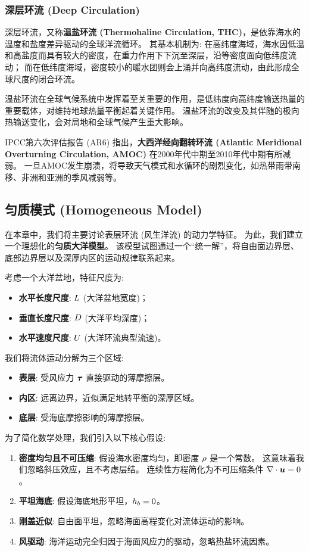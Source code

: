 \subsubsection{深层环流 (Deep Circulation)}

深层环流，又称\textbf{温盐环流 (Thermohaline Circulation, THC)}，是依靠海水的温度和盐度差异驱动的全球洋流循环。
其基本机制为: 在高纬度海域，海水因低温和高盐度而具有较大的密度，在重力作用下下沉至深层，沿等密度面向低纬度流动；
而在低纬度海域，密度较小的暖水团则会上涌并向高纬度流动，由此形成全球尺度的闭合环流。

温盐环流在全球气候系统中发挥着至关重要的作用，是低纬度向高纬度输送热量的重要载体，对维持地球热量平衡起着关键作用。
温盐环流的改变及其伴随的极向热输送变化，会对局地和全球气候产生重大影响。

IPCC第六次评估报告 (AR6) 指出，\textbf{大西洋经向翻转环流 (Atlantic Meridional Overturning Circulation, AMOC)} 在2000年代中期至2010年代中期有所减弱。
一旦AMOC发生崩溃，将导致天气模式和水循环的剧烈变化，如热带雨带南移、非洲和亚洲的季风减弱等。

\subsection{匀质模式 (Homogeneous Model)}

在本章中，我们将主要讨论表层环流 (风生洋流) 的动力学特征。
为此，我们建立一个理想化的\textbf{匀质大洋模型}。
该模型试图通过一个“统一解”，将自由面边界层、底部边界层以及深厚内区的运动规律联系起来。

考虑一个大洋盆地，特征尺度为:
\begin{itemize}
    \item \textbf{水平长度尺度}: $L$ (大洋盆地宽度)；
    \item \textbf{垂直长度尺度}: $D$ (大洋平均深度)；
    \item \textbf{水平速度尺度}: $U$ (大洋环流典型流速)。
\end{itemize}

我们将流体运动分解为三个区域:
\begin{itemize}
    \item \textbf{表层}: 受风应力 ${\bm{\tau}}$ 直接驱动的薄摩擦层。
    \item \textbf{内区}: 远离边界，近似满足地转平衡的深厚区域。
    \item \textbf{底层}: 受海底摩擦影响的薄摩擦层。
\end{itemize}

为了简化数学处理，我们引入以下核心假设:
\begin{enumerate}
    \item \textbf{密度均匀且不可压缩}: 假设海水密度均匀，即密度 $\rho$ 是一个常数。
    这意味着我们忽略斜压效应，且不考虑层结。
    连续性方程简化为不可压缩条件 $\nabla \cdot \bm{u} = 0$。
    \item \textbf{平坦海底}: 假设海底地形平坦，$h_b = 0$。
    \item \textbf{刚盖近似}: 自由面平坦，忽略海面高程变化对流体运动的影响。
    \item \textbf{风驱动}: 海洋运动完全归因于海面风应力的驱动，忽略热盐环流因素。
\end{enumerate}

